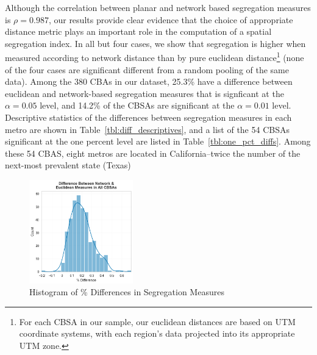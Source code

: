 \documentclass[
  10pt,
]{article}
\begin{document}
Although the correlation between planar and network based segregation
measures is \(\rho=0.987\), our results provide clear evidence that the
choice of appropriate distance metric plays an important role in the
computation of a spatial segregation index. In all but four cases, we
show that segregation is higher when measured according to network
distance than by pure euclidean distance\footnote{For each CBSA in our
  sample, our euclidean distances are based on UTM coordinate systems,
  with each region's data projected into its appropriate UTM zone.}
(none of the four cases are significant different from a random pooling
of the same data). Among the 380 CBAs in our dataset, 25.3\% have a
difference between euclidean and network-based segregation measures that
is signficant at the \(\alpha=0.05\) level, and 14.2\% of the CBSAs are
significant at the \(\alpha=0.01\) level. Descriptive statistics of the
differences between segregation measures in each metro are shown in
Table~\ref{tbl:diff_descriptives}, and a list of the 54 CBSAs
significant at the one percent level are listed in
Table~\ref{tbl:one_pct_diffs}. Among these 54 CBAS, eight metros are
located in California--twice the number of the next-most prevalent state
(Texas)

\begin{figure}
\hypertarget{fig:diff_hists}{%
\centering
\includegraphics[width=0.4\textwidth,height=\textheight]{./figures/diff_hist.png}
\caption{Histogram of \% Differences in Segregation
Measures}\label{fig:diff_hists}
}
\end{figure}
\end{document}
